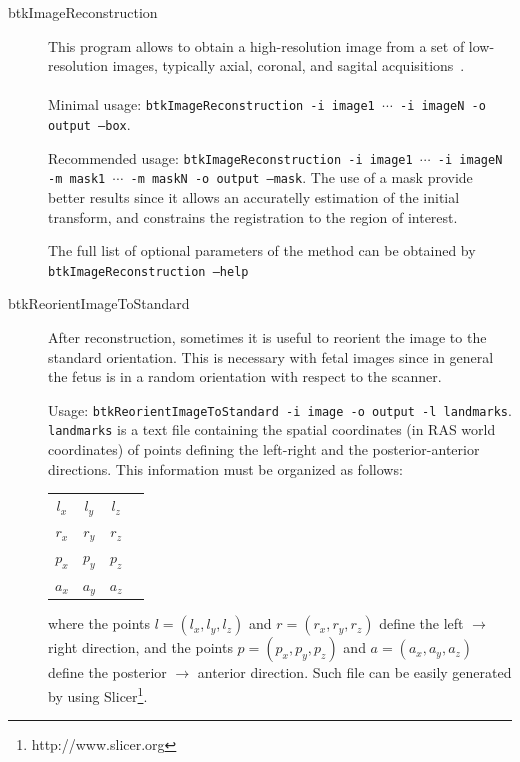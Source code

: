 \begin{description}
 \item[btkImageReconstruction] This program allows to obtain a
high-resolution image from a set of low-resolution images, typically
axial, coronal, and sagital acquisitions~\cite{Rousseau2006}. \\\\
Minimal usage: \texttt{btkImageReconstruction -i image1 $\cdots$ -i imageN -o
output --box}. 

Recommended usage: \texttt{btkImageReconstruction -i image1 $\cdots$ -i imageN
-m mask1 $\cdots$ -m maskN -o output --mask}. The use of a mask provide
better results since it allows an accuratelly estimation of the initial
transform, and constrains the registration to the region of interest.

The full list of optional parameters of the method can be obtained by
\texttt{btkImageReconstruction --help}

\item[btkReorientImageToStandard] After reconstruction, sometimes it is useful
to reorient the image to the standard orientation. This is necessary with fetal
images since in general the fetus is in a random orientation with respect to the
scanner.

Usage: \texttt{btkReorientImageToStandard -i image -o output -l landmarks}.
\texttt{landmarks} is a text file containing the spatial coordinates (in
RAS world coordinates) of points defining the left-right and the
posterior-anterior directions. This information must be organized as follows:

\begin{tabular}{cccc}
$l_x$ & $l_y$ & $l_z$ \\
$r_x$ & $r_y$ & $r_z$ \\
$p_x$ & $p_y$ & $p_z$ \\
$a_x$ & $a_y$ & $a_z$ 
\end{tabular}

where the points $l=(l_x, l_y, l_z)$ and $r=(r_x, r_y, r_z)$ define the
left $\rightarrow$ right direction, and the points $p=(p_x, p_y, p_z)$ and
$a=(a_x, a_y, a_z)$ define the posterior $\rightarrow$ anterior direction. Such
file can be easily generated by using Slicer\footnote{http://www.slicer.org}.

\end{description}

